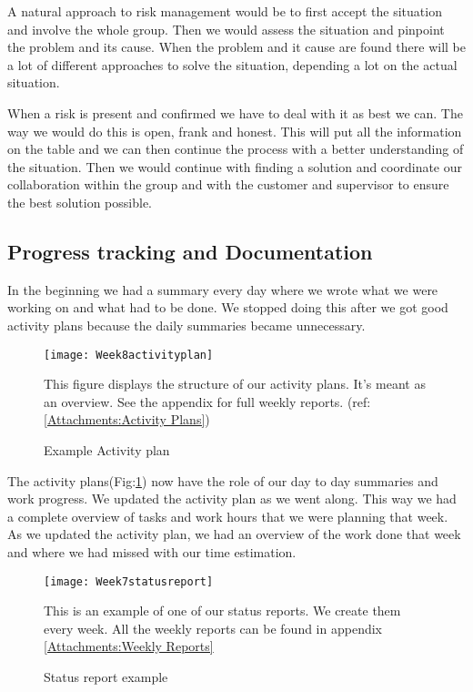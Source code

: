     A natural approach to risk management would be to first accept the situation and involve the whole group. Then we would assess the situation and pinpoint the problem and its cause. When the problem and it cause are found there will be a lot of different approaches to solve the situation, depending a lot on the actual situation. 
    
    When a risk is present and confirmed we have to deal with it as best we can. The way we would do this is open, frank and honest. This will put all the information on the table and we can then continue the process with a better understanding of the situation. Then we would continue with finding a solution and coordinate our collaboration within the group and with the customer and supervisor to ensure the best solution possible.

    \subsection{Progress tracking and Documentation}\label{Progress tracking and Documentation}
    In the beginning we had a summary every day where we wrote what we were working on and what had to be done. We stopped doing this after we got good activity plans because the daily summaries became unnecessary. 
    
    \begin{figure}[H]
        \centering
        \texttt{[image: Week8activityplan]}
        \caption{Example Activity plan}
        This figure displays the structure of our activity plans. It's meant as an overview. See the appendix for full weekly reports. 
        (ref:\ref{Attachments:Activity Plans})
        \label{fig:Week8activityplan}
    \end{figure}
    
    The activity plans(Fig:\ref{fig:Week8activityplan}) now have the role of our day to day summaries and work progress. We updated the activity plan as we went along. This way we had a complete overview of tasks and work hours that we were planning that week. As we updated the activity plan, we had an overview of the work done that week and where we had missed with our time estimation. 
    
    \begin{figure}[H]
        \centering
        \texttt{[image: Week7statusreport]}
        \caption{Status report example}
        This is an example of one of our status reports. We create them every week. All the weekly reports can be found in appendix \ref{Attachments:Weekly Reports}
        \label{fig:Week7statusreport}
    \end{figure}
    
